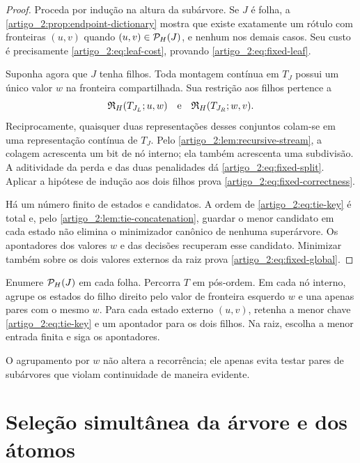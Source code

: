 \begin{proof}
Proceda por indução na altura da subárvore. Se $J$ é folha, a
\cref{artigo_2:prop:endpoint-dictionary} mostra que existe exatamente um rótulo com
fronteiras $(u,v)$ quando $(u,v)\in\mathcal{P}_H(J)$, e nenhum nos demais casos.
Seu custo é precisamente \eqref{artigo_2:eq:leaf-cost}, provando
\eqref{artigo_2:eq:fixed-leaf}.

Suponha agora que $J$ tenha filhos. Toda montagem contínua em $T_J$ possui um
único valor $w$ na fronteira compartilhada. Sua restrição aos filhos pertence
a
\[
 \mathfrak{R}_H(T_{J_L};u,w)
 \quad\text{e}\quad
 \mathfrak{R}_H(T_{J_R};w,v).
\]
Reciprocamente, quaisquer duas representações desses conjuntos colam-se em
uma representação contínua de $T_J$. Pelo \cref{artigo_2:lem:recursive-stream}, a
colagem acrescenta um bit de nó interno; ela também acrescenta uma
subdivisão. A aditividade da perda e das duas penalidades dá
\eqref{artigo_2:eq:fixed-split}. Aplicar a hipótese de indução aos dois filhos prova
\eqref{artigo_2:eq:fixed-correctness}.

Há um número finito de estados e candidatos. A ordem de
\eqref{artigo_2:eq:tie-key} é total e, pelo \cref{artigo_2:lem:tie-concatenation}, guardar o
menor candidato em cada estado não elimina o minimizador canônico de nenhuma
superárvore. Os apontadores dos valores $w$ e das decisões recuperam esse
candidato. Minimizar também sobre os dois valores externos da raiz prova
\eqref{artigo_2:eq:fixed-global}.
\end{proof}

\begin{algorithm}\label{map:artigo_2:6.3}
\label{artigo_2:alg:fixed-tree}
Enumere $\mathcal{P}_H(J)$ em cada folha. Percorra $T$ em pós-ordem. Em cada nó
interno, agrupe os estados do filho direito pelo valor de fronteira esquerdo
$w$ e una apenas pares com o mesmo $w$. Para cada estado externo $(u,v)$,
retenha a menor chave \eqref{artigo_2:eq:tie-key} e um apontador para os dois filhos.
Na raiz, escolha a menor entrada finita e siga os apontadores.
\end{algorithm}

O agrupamento por $w$ não altera a recorrência; ele apenas evita testar pares
de subárvores que violam continuidade de maneira evidente.

\section{Seleção simultânea da árvore e dos átomos}
\label{artigo_2:sec:variable-dp}


